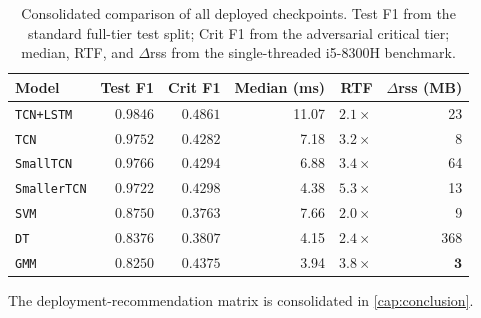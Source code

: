 \begin{table}[h]
\centering
\small
\begin{tabular}{lrrrrr}
\toprule
\textbf{Model} & \textbf{Test F1} & \textbf{Crit F1} & \textbf{Median (ms)} & \textbf{RTF} & \textbf{$\Delta$rss (MB)} \\
\midrule
\texttt{TCN+LSTM}   & $\mathbf{0.9846}$ & $\mathbf{0.4861}$ & 11.07 & $2.1\times$ & 23 \\
\texttt{TCN}        & $0.9752$          & $0.4282$          & 7.18  & $3.2\times$ & 8 \\
\texttt{SmallTCN}   & $0.9766$          & $0.4294$          & 6.88  & $3.4\times$ & 64 \\
\texttt{SmallerTCN} & $0.9722$          & $0.4298$          & 4.38  & $\mathbf{5.3\times}$ & 13 \\
\texttt{SVM}        & $0.8750$          & $0.3763$          & 7.66  & $2.0\times$ & 9 \\
\texttt{DT}         & $0.8376$          & $0.3807$          & 4.15  & $2.4\times$ & 368 \\
\texttt{GMM}        & $0.8250$          & $0.4375$          & 3.94  & $3.8\times$ & $\mathbf{3}$ \\
\bottomrule
\end{tabular}
\caption{Consolidated comparison of all deployed checkpoints. Test F1 from the standard full-tier test split; Crit F1 from the adversarial critical tier; median, RTF, and $\Delta$rss from the single-threaded i5-8300H benchmark.}
\label{tab:summary_consolidated}
\end{table}

The deployment-recommendation matrix is consolidated in \cref{cap:conclusion}.
